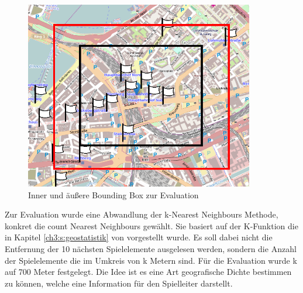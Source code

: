 \begin{figure}[H]
\begin{center}
\includegraphics[width=100mm]{images/ch6_img04_bbox.png}
\caption{Inner und äußere Bounding Box zur Evaluation}
\label{img:ch6_img04_bbox}
\end{center}
\end{figure}

Zur Evaluation wurde eine Abwandlung der k-Nearest Neighbours Methode, konkret die count Nearest Neighbours gewählt.
Sie basiert auf der K-Funktion die in Kapitel \ref{ch3:s:geostatistik} von \textcite{Spooner.2004} vorgestellt wurde.
Es soll dabei nicht die Entfernung der 10 nächsten Spielelemente ausgelesen werden, sondern die Anzahl der Spielelemente die im  Umkreis von k Metern sind. Für die Evaluation wurde k auf 700 Meter festgelegt. Die Idee ist es eine Art geografische Dichte bestimmen zu können, welche eine Information für den Spielleiter darstellt.


